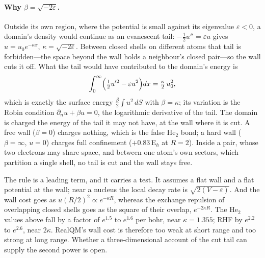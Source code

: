 \documentclass[11pt]{article}
\begin{document}
\paragraph{Why $\beta=\sqrt{-2\varepsilon}$.}
Outside its own region, where the potential is small against its eigenvalue $\varepsilon<0$, a domain's
density would continue as an evanescent tail: $-\tfrac12u''=\varepsilon u$ gives $u=u_0e^{-\kappa x}$,
$\kappa=\sqrt{-2\varepsilon}$. Between closed shells on different atoms that tail is forbidden---the space
beyond the wall holds a neighbour's closed pair---so the wall cuts it off. What the tail would have
contributed to the domain's energy is
\[
\int_0^\infty\Bigl(\tfrac12u'^2-\varepsilon u^2\Bigr)dx=\tfrac{\kappa}{2}\,u_0^2 ,
\]
which is exactly the surface energy $\tfrac{\beta}{2}\int u^2\,dS$ with $\beta=\kappa$; its variation is the
Robin condition $\partial_nu+\beta u=0$, the logarithmic derivative of the tail. The domain is charged the
energy of the tail it may not have, at the wall where it is cut. A free wall ($\beta=0$) charges nothing,
which is the false He$_2$ bond; a hard wall ($\beta=\infty$, $u=0$) charges full confinement
($+0.83$\,E$_h$ at $R=2$). Inside a pair, whose two electrons may share space, and between one atom's own
sectors, which partition a single shell, no tail is cut and the wall stays free.

The rule is a leading term, and it carries a test. It assumes a flat wall and a flat potential at the
wall; near a nucleus the local decay rate is $\sqrt{2(V-\varepsilon)}$. And the wall cost goes as
$u(R/2)^2\propto e^{-\kappa R}$, whereas the exchange repulsion of overlapping closed shells goes as the
square of their overlap, $e^{-2\kappa R}$. The He$_2$ values above fall by a factor of $e^{1.5}$ to $e^{1.6}$ per
bohr, near $\kappa=1.355$; RHF by $e^{2.2}$ to $e^{2.6}$, near $2\kappa$. RealQM's wall cost is
therefore too weak at short range and too strong at long range. Whether a three-dimensional account of
the cut tail can supply the second power is open.
\end{document}
